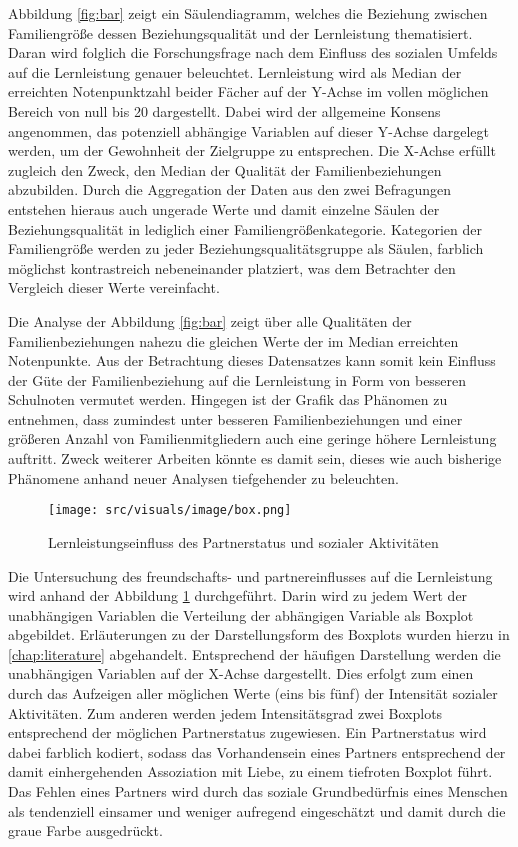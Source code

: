 Abbildung \ref{fig:bar} zeigt ein Säulendiagramm, welches die Beziehung zwischen Familiengröße dessen Beziehungsqualität und der Lernleistung thematisiert.
Daran wird folglich die Forschungsfrage nach dem Einfluss des sozialen Umfelds auf die Lernleistung genauer beleuchtet.
Lernleistung wird als Median der erreichten Notenpunktzahl beider Fächer auf der Y-Achse im vollen möglichen Bereich von null bis 20 dargestellt.
Dabei wird der allgemeine Konsens angenommen, das potenziell abhängige Variablen auf dieser Y-Achse dargelegt werden, um der Gewohnheit der Zielgruppe zu entsprechen.
Die X-Achse erfüllt zugleich den Zweck, den Median der Qualität der Familienbeziehungen abzubilden.
Durch die Aggregation der Daten aus den zwei Befragungen entstehen hieraus auch ungerade Werte und damit einzelne Säulen der Beziehungsqualität in lediglich einer Familiengrößenkategorie.
Kategorien der Familiengröße werden zu jeder Beziehungsqualitätsgruppe als Säulen, farblich möglichst kontrastreich nebeneinander platziert, was dem Betrachter den Vergleich dieser Werte vereinfacht. 

Die Analyse der Abbildung \ref{fig:bar} zeigt über alle Qualitäten der Familienbeziehungen nahezu die gleichen Werte der im Median erreichten Notenpunkte.
Aus der Betrachtung dieses Datensatzes kann somit kein Einfluss der Güte der Familienbeziehung auf die Lernleistung in Form von besseren Schulnoten vermutet werden.
Hingegen ist der Grafik das Phänomen zu entnehmen, dass zumindest unter besseren Familienbeziehungen und einer größeren Anzahl von Familienmitgliedern auch eine geringe höhere Lernleistung auftritt.
Zweck weiterer Arbeiten könnte es damit sein, dieses wie auch bisherige Phänomene anhand neuer Analysen tiefgehender zu beleuchten.

\begin{figure}[htb]
    \centering
    \texttt{[image: src/visuals/image/box.png]}
    \caption{Lernleistungseinfluss des Partnerstatus und sozialer Aktivitäten}
    \label{fig:box}
\end{figure}

Die Untersuchung des freundschafts- und partnereinflusses auf die Lernleistung wird anhand der Abbildung \ref{fig:box} durchgeführt.
Darin wird zu jedem Wert der unabhängigen Variablen die Verteilung der abhängigen Variable als Boxplot abgebildet.
Erläuterungen zu der Darstellungsform des Boxplots wurden hierzu in \autoref{chap:literature} abgehandelt.
Entsprechend der häufigen Darstellung werden die unabhängigen Variablen auf der X-Achse dargestellt.
Dies erfolgt zum einen durch das Aufzeigen aller möglichen Werte (eins bis fünf) der Intensität sozialer Aktivitäten.
Zum anderen werden jedem Intensitätsgrad zwei Boxplots entsprechend der möglichen Partnerstatus zugewiesen.
Ein Partnerstatus wird dabei farblich kodiert, sodass das Vorhandensein eines Partners entsprechend der damit einhergehenden Assoziation mit Liebe, zu einem tiefroten Boxplot führt.
Das Fehlen eines Partners wird durch das soziale Grundbedürfnis eines Menschen als tendenziell einsamer und weniger aufregend eingeschätzt und damit durch die graue Farbe ausgedrückt.

